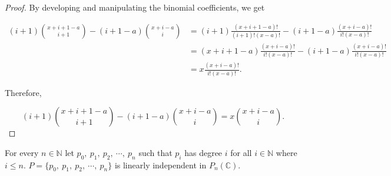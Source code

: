 \documentclass[12pt]{article}
\begin{document}
\begin{proof}

    By developing and manipulating the binomial coefficients, we get

    \begin{align*}
        (i+1)\binom{x+i+1-a}{i+1} - (i+1-a)\binom{x+i-a}{i} & = (i+1)\frac{(x+i+1-a)!}{(i+1)!(x-a)!} - (i+1-a)\frac{(x+i-a)!}{i!(x-a)!} \\
                                                            & = (x+i+1-a)\frac{(x+i-a)!}{i!(x-a)!} - (i+1-a)\frac{(x+i-a)!}{i!(x-a)!}   \\
                                                            & = x\frac{(x+i-a)!}{i!(x-a)!}.
    \end{align*}

    Therefore,

    $$
        \boxed{(i+1)\binom{x+i+1-a}{i+1} - (i+1-a)\binom{x+i-a}{i} = x\binom{x+i-a}{i}}.
    $$

\end{proof}

\vspace{20px}

\begin{theorem}
    \label{polynomial_li}

    For every $n \in \mathbb{N}$ let $p_0,\ p_1,\ p_2,\ \cdots,\ p_n$ such that $p_i$ has degree $i$ for all $i \in \mathbb{N}$ where $i \leq n$. $\displaystyle P = \{ p_0,\ p_1,\ p_2,\ \cdots,\ p_n \}$ is linearly independent in $P_n(\mathbb{C})$.

\end{theorem}
\end{document}
